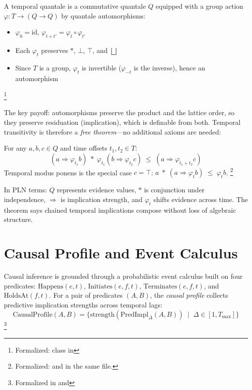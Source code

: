 \documentclass[11pt,openany]{report}
\begin{document}
\begin{definition}
A temporal quantale is a commutative quantale $Q$ equipped with a
group action $\varphi : T \to (Q \to Q)$ by quantale automorphisms:
\begin{itemize}
\item $\varphi_0 = \mathrm{id}$, \quad
  $\varphi_{t+t'} = \varphi_t \circ \varphi_{t'}$
\item Each $\varphi_t$ preserves $*$, $\bot$, $\top$, and $\bigsqcup$
\item Since $T$ is a group, $\varphi_t$ is invertible
  ($\varphi_{-t}$ is the inverse), hence an automorphism
\end{itemize}%
\footnote{Formalized:
 class in
}
\end{definition}

\noindent
The key payoff: automorphisms preserve the product and the lattice
order, so they preserve residuation (implication), which is definable
from both.  Temporal transitivity is therefore a \emph{free
theorem}---no additional axioms are needed:

\begin{theorem}
\label{thm:temporal-transitivity}
For any $a, b, c \in Q$ and time offsets $t_1, t_2 \in T$:
\[
  (a \Rightarrow \varphi_{t_1} b) \;*\;
  \varphi_{t_1}(b \Rightarrow \varphi_{t_2} c)
  \;\le\;
  (a \Rightarrow \varphi_{t_1 + t_2} c)
\]
Temporal modus ponens is the special case $c = \top$:
$a \;*\; (a \Rightarrow \varphi_t b) \;\le\; \varphi_t b$.%
\footnote{Formalized:
 and
 in the same file.}
\end{theorem}

\noindent
In PLN terms: $Q$ represents evidence values, $*$ is conjunction
under independence, $\Rightarrow$ is implication strength, and
$\varphi_t$ shifts evidence across time.  The theorem says chained
temporal implications compose without loss of algebraic structure.


\section{Causal Profile and Event Calculus}

Causal inference is grounded through a probabilistic event calculus
built on four predicates: $\mathrm{Happens}(e, t)$,
$\mathrm{Initiates}(e, f, t)$, $\mathrm{Terminates}(e, f, t)$, and
$\mathrm{HoldsAt}(f, t)$.  For a pair of predicates $(A, B)$, the
\emph{causal profile} collects predictive implication strengths across
temporal lags:
\[
  \mathrm{CausalProfile}(A, B) =
  \bigl\{\mathrm{strength}(\mathrm{PredImpl}_\Delta(A, B))
  \;\mid\; \Delta \in [1, T_{\max}]\bigr\}
\]%
\footnote{Formalized in
 and
}
\end{document}
